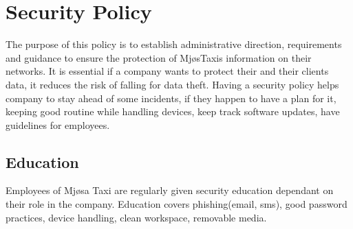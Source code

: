 \chapter{Security Policy}
\label{chap:securityPolicy}


The purpose of this policy is to establish administrative direction, requirements and guidance to ensure the protection of MjøsTaxis information on their networks.
It is essential if a company wants to protect their and their clients data, it reduces the risk of falling for data theft.
Having a security policy helps company to stay ahead of some incidents, if they happen to have a plan for it, keeping good routine while handling devices, keep track software updates, have guidelines for employees.

\section{Education}
Employees of Mjøsa Taxi are regularly given security education dependant on their role in the company.
Education covers phishing(email, sms), good password practices, device handling, clean workspace, removable media.


